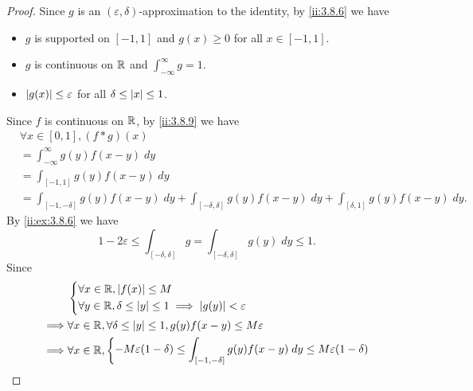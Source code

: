 \begin{proof}
  Since \(g\) is an \((\varepsilon, \delta)\)-approximation to the identity, by \cref{ii:3.8.6} we have
  \begin{itemize}
    \item \(g\) is supported on \([-1, 1]\) and \(g(x) \geq 0\) for all \(x \in [-1, 1]\).
    \item \(g\) is continuous on \(\mathbb{R}\) and \(\int_{-\infty}^\infty g = 1\).
    \item \(\left\lvert g(x)\right\rvert \leq \varepsilon\) for all \(\delta \leq \left\lvert x\right\rvert \leq 1\).
  \end{itemize}
  Since \(f\) is continuous on \(\mathbb{R}\), by \cref{ii:3.8.9} we have
  \begin{align*}
     & \forall x \in [0, 1], (f * g)(x)                                                                                                    \\
     & = \int_{-\infty}^\infty g(y) f(x - y) \; dy                                                                                         \\
     & = \int_{[-1, 1]} g(y) f(x - y) \; dy                                                                                                \\
     & = \int_{[-1, -\delta]} g(y) f(x - y) \; dy + \int_{[-\delta, \delta]} g(y) f(x - y) \; dy + \int_{[\delta, 1]} g(y) f(x - y) \; dy.
  \end{align*}
  By \cref{ii:ex:3.8.6} we have
  \[
    1 - 2 \varepsilon \leq \int_{[-\delta, \delta]} g = \int_{[-\delta, \delta]} g(y) \; dy \leq 1.
  \]
  Since
  \begin{align*}
             & \begin{dcases}
                 \forall x \in \R, \abs{f(x)} \leq M \\
                 \forall y \in \R, \delta \leq \abs{y} \leq 1 \implies \abs{g(y)} < \varepsilon
               \end{dcases}                                                                         \\
    \implies & \forall x \in \R, \forall \delta \leq \abs{y} \leq 1, g(y) f(x - y) \leq M \varepsilon                                                                \\
    \implies & \forall x \in \R, \begin{dcases}
                                   -M \varepsilon (1 - \delta) \leq \int_{[-1, -\delta]} g(y) f(x - y) \; dy \leq M \varepsilon (1 - \delta) \\

\end{dcases}
\end{align*}
\end{proof}
